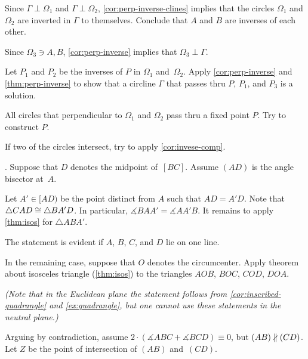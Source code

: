 \begin{multicols}{2}
Since $\Gamma\perp\Omega_1$ and $\Gamma\perp\Omega_2$,
\ref{cor:perp-inverse-clines} 
implies that
the circles $\Omega_1$ and $\Omega_2$ are inverted in $\Gamma$ 
to themselves.
Conclude that $A$ and $B$ are inverses of each other.

Since $\Omega_3\ni A,B$,
\ref{cor:perp-inverse} implies that
$\Omega_3\perp \Gamma$.

Let $P_1$ and $P_2$ be the inverses of $P$ 
in $\Omega_1$ and~$\Omega_2$.
Apply \ref{cor:perp-inverse} and \ref{thm:perp-inverse}
to show that a circline $\Gamma$ that passes thru $P$, $P_1$, and $P_3$ is a solution.

All circles that perpendicular to $\Omega_1$ and $\Omega_2$ pass thru a fixed point $P$.
Try to construct $P$.

If two of the circles intersect, try to apply \ref{cor:invese-comp}.

\setcounter{eqtn}{0}

\parbf{\ref{ex:abs-bisect=median}}.
Suppose that $D$ denotes the midpoint of~$[BC]$.
Assume $(AD)$ is the angle bisector at~$A$.

Let $A'\in [AD)$ be the point distinct from $A$ such that $AD=A'D$.
Note that $\triangle CAD\z\cong\triangle BA'D$.
In particular, $\measuredangle BAA'=\measuredangle AA'B$.
It remains to apply \ref{thm:isos} for $\triangle ABA'$.

The statement is evident if $A$, $B$, $C$, and $D$ lie on one line.

In the remaining case, suppose that $O$ denotes the circumcenter.
Apply theorem about isosceles triangle (\ref{thm:isos}) to the triangles 
$AOB$,
$BOC$, 
$COD$, 
$DOA$. 

\textit{(Note that in the Euclidean plane the statement follows from \ref{cor:inscribed-quadrangle} and \ref{ex:quadrangle},
but one cannot use these statements in the neutral plane.)}

Arguing by contradiction, 
assume 
$2\cdot(\measuredangle ABC+\measuredangle BCD)\equiv0$, 
but $(AB)\z\nparallel(C D)$.
Let $Z$ be the point of intersection of $(AB)$ and~$(CD)$.


\end{multicols}
